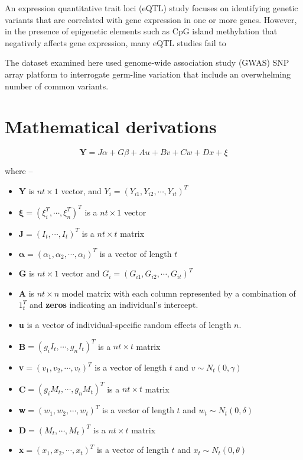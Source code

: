 \documentclass[hidelinks]{article}
\begin{document}
An expression quantitative trait loci (eQTL) study focuses on identifying genetic variants that are correlated with gene expression in one or more genes. However, in the presence of epigenetic elements such as CpG island methylation that negatively affects gene expression, many eQTL studies fail to 

The dataset examined here used genome-wide association study (GWAS) SNP array platform to interrogate germ-line variation that include an overwhelming number of common variants. 

\section{Mathematical derivations}

\begingroup
\large
\begin{equation}
\textbf{Y} = J \alpha + G\beta + Au + Bv + Cw + Dx  + \xi
\end{equation}
\endgroup

where --

\begin{itemize}
\large
\item \textbf{Y} is \emph{$nt \times 1$} vector, and $Y_i = \left(Y_{i1}, Y_{i2}, \cdots , Y_{it} \right)^T$
\item $\boldsymbol{\xi} = \left( \xi_i^T, \cdots , \xi_n^T \right)^T$ is a \emph{$nt \times 1$} vector
\item $\boldsymbol{J} = \left( I_t, \cdots , I_t \right)^T$ is a $nt \times t$ matrix
\item $\boldsymbol{\alpha} =\left( \alpha_1, \alpha_2, \cdots , \alpha_t \right)^T$ is a vector of length $t$
\item \textbf{G} is $nt \times 1$ vector and $G_i = \left(G_{i1}, G_{i2}, \cdots , G_{it} \right)^T$
\item \textbf{A} is $nt \times n$ model matrix with each column represented by a combination of $1_t^T$ and \textbf{zeros} indicating an individual's intercept. 
\item \textbf{u} is a vector of individual-specific random effects of length $n$.
\item \textbf{B}$=\left(g_i I_t, \cdots , g_n I_t \right)^T$ is a $nt \times t$ matrix
\item \textbf{v}$=\left(v_1, v_2, \cdots, v_t\right)^T$ is a vector of length $t$ and $v \sim N_t \left(0, \gamma \right)$
\item \textbf{C}$=\left(g_i M_t, \cdots , g_n M_t \right)^T$ is a $nt \times t$ matrix
\item \textbf{w}$=\left(w_1, w_2, \cdots, w_t\right)^T$ is a vector of length $t$ and $w_{t} \sim N_t \left(0, \delta \right)$
\item \textbf{D}$=\left( M_t, \cdots, M_t \right)^T$ is a $nt \times t$ matrix
\item \textbf{x}$=\left(x_1, x_2, \cdots, x_t\right)^T$ is a vector of length $t$ and $x_t \sim N_t \left(0, \theta \right)$
\end{itemize}
\end{document}

